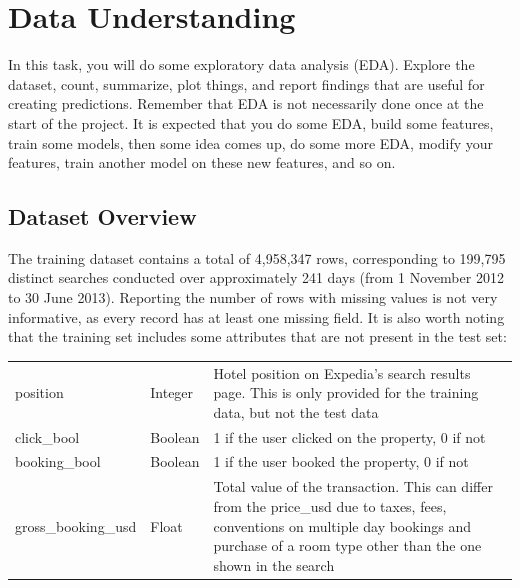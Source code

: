 \documentclass[runningheads]{llncs}
\begin{document}
\section{Data Understanding}

\color{blue}In this task, you will do some exploratory data analysis (EDA). Explore the dataset, count, summarize, plot things, and report findings that are useful for creating predictions. Remember that EDA is not necessarily done once at the start of the project. It is expected that you do some EDA, build some features, train some models, then some idea comes up, do some more EDA, modify your features, train another model on these new features, and so on.\color{black}

\subsection{Dataset Overview}
The training dataset contains a total of 4,958,347 rows, corresponding to 199,795 distinct searches conducted over approximately 241 days (from 1 November 2012 to 30 June 2013). Reporting the number of rows with missing values is not very informative, as every record has at least one missing field. It is also worth noting that the training set includes some attributes that are not present in the test set:

\begin{table}[ht]
\centering
\renewcommand{\arraystretch}{1.15}

\begin{tabularx}{\textwidth}{@{}%
    >{\raggedright\arraybackslash}p{}
    >{\raggedright\arraybackslash}p{}
    X@{}}
\hline
& \multicolumn{2}{c}{\textbf{Training set only}} \\
\hline
position & Integer &
Hotel position on Expedia's search results page. This is only provided for the training data, but not the test data \\
\hline
click\_bool & Boolean &
1 if the user clicked on the property, 0 if not \\
\hline
booking\_bool & Boolean &
1 if the user booked the property, 0 if not \\
\hline
gross\_booking\_usd & Float &
Total value of the transaction. This can differ from the price\_usd due to taxes, fees, conventions on multiple day bookings and purchase of a room type other than the one shown in the search \\
\hline
\end{tabularx}

\end{table}
\end{document}
